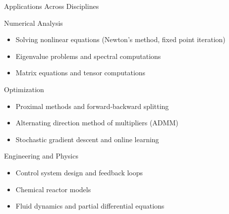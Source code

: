 \documentclass[aspectratio=169,10pt]{beamer}
\begin{document}
\begin{frame}{Applications Across Disciplines}
  \begin{block}{Numerical Analysis}
    \begin{itemize}
      \item Solving nonlinear equations (Newton's method, fixed point iteration)
      \item Eigenvalue problems and spectral computations
      \item Matrix equations and tensor computations
    \end{itemize}
  \end{block}

  \begin{block}{Optimization}
    \begin{itemize}
      \item Proximal methods and forward-backward splitting
      \item Alternating direction method of multipliers (ADMM)
      \item Stochastic gradient descent and online learning
    \end{itemize}
  \end{block}

  \begin{block}{Engineering and Physics}
    \begin{itemize}
      \item Control system design and feedback loops
      \item Chemical reactor models
      \item Fluid dynamics and partial differential equations
    \end{itemize}
  \end{block}
\end{frame}
\end{document}
